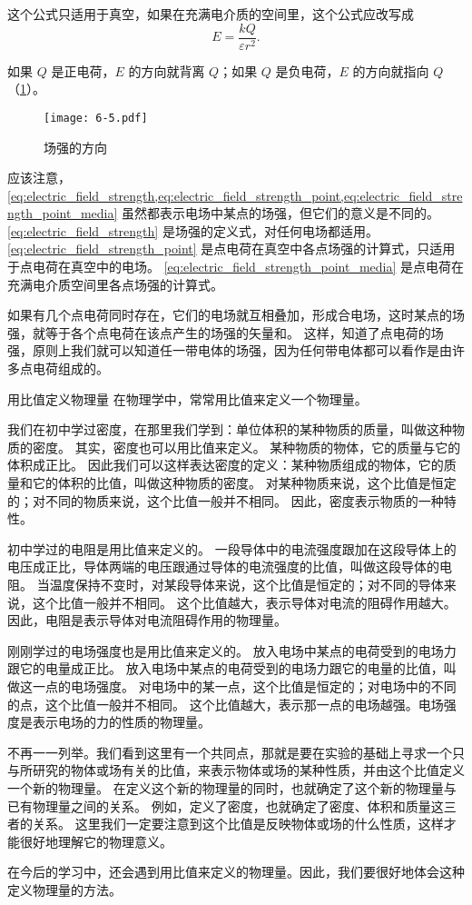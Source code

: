 这个公式只适用于真空，如果在充满电介质的空间里，这个公式应改写成
\begin{equation}
	\label{eq:electric_field_strength_point_media}
	E=\frac{kQ}{\varepsilon r^2}.
\end{equation}

如果 $Q$ 是正电荷，$E$ 的方向就背离 $Q$；如果 $Q$ 是负电荷，$E$ 的方向就指向 $Q$（\cref{fig:6-5}）。
\begin{figure}
	\texttt{[image: 6-5.pdf]}
	\caption{场强的方向}\label{fig:6-5}
\end{figure}

应该注意，\cref{eq:electric_field_strength,eq:electric_field_strength_point,eq:electric_field_strength_point_media} 虽然都表示电场中某点的场强，但它们的意义是不同的。
\cref{eq:electric_field_strength} 是场强的定义式，对任何电场都适用。
\cref{eq:electric_field_strength_point} 是点电荷在真空中各点场强的计算式，只适用于点电荷在真空中的电场。
\cref{eq:electric_field_strength_point_media} 是点电荷在充满电介质空间里各点场强的计算式。

如果有几个点电荷同时存在，它们的电场就互相叠加，形成合电场，这时某点的场强，就等于各个点电荷在该点产生的场强的矢量和。
这样，知道了点电荷的场强，原则上我们就可以知道任一带电体的场强，因为任何带电体都可以看作是由许多点电荷组成的。

\begin{Reading}{用比值定义物理量}
在物理学中，常常用比值来定义一个物理量。

我们在初中学过密度，在那里我们学到：单位体积的某种物质的质量，叫做这种物质的密度。
其实，密度也可以用比值来定义。
某种物质的物体，它的质量与它的体积成正比。
因此我们可以这样表达密度的定义：某种物质组成的物体，它的质量和它的体积的比值，叫做这种物质的密度。
对某种物质来说，这个比值是恒定的；对不同的物质来说，这个比值一般并不相同。
因此，密度表示物质的一种特性。

初中学过的电阻是用比值来定义的。
一段导体中的电流强度跟加在这段导体上的电压成正比，导体两端的电压跟通过导体的电流强度的比值，叫做这段导体的电阻。
当温度保持不变时，对某段导体来说，这个比值是恒定的；对不同的导体来说，这个比值一般并不相同。
这个比值越大，表示导体对电流的阻碍作用越大。
因此，电阻是表示导体对电流阻碍作用的物理量。

刚刚学过的电场强度也是用比值来定义的。
放入电场中某点的电荷受到的电场力跟它的电量成正比。
放入电场中某点的电荷受到的电场力跟它的电量的比值，叫做这一点的电场强度。
对电场中的某一点，这个比值是恒定的；对电场中的不同的点，这个比值一般并不相同。
这个比值越大，表示那一点的电场越强。电场强度是表示电场的力的性质的物理量。

不再一一列举。我们看到这里有一个共同点，那就是要在实验的基础上寻求一个只与所研究的物体或场有关的比值，来表示物体或场的某种性质，并由这个比值定义一个新的物理量。
在定义这个新的物理量的同时，也就确定了这个新的物理量与已有物理量之间的关系。
例如，定义了密度，也就确定了密度、体积和质量这三者的关系。
这里我们一定要注意到这个比值是反映物体或场的什么性质，这样才能很好地理解它的物理意义。

在今后的学习中，还会遇到用比值来定义的物理量。因此，我们要很好地体会这种定义物理量的方法。
\end{Reading}

